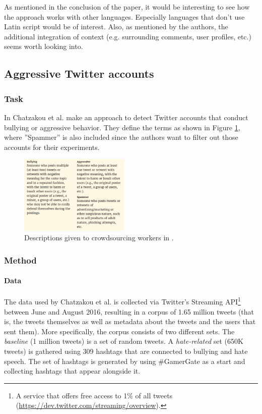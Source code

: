 \documentclass{proseminar}
\begin{document}
As mentioned in the conclusion of the paper, it would be interesting to see how the approach works with other languages. Especially languages that don't use Latin script would be of interest. Also, as mentioned by the authors, the additional integration of context (e.g. surrounding comments, user profiles, etc.) seems worth looking into.

\subsection{Aggressive Twitter accounts}
\subsubsection{Task}
In \cite{Twitter:2017} Chatzakou et al. make an approach to detect Twitter accounts that conduct bullying or aggressive behavior. They define the terms as shown in Figure \ref{fig:twitter_defs}, where ''Spammer'' is also included since the authors want to filter out those accounts for their experiments.

\begin{figure}
\centering
\includegraphics[width=0.47\textwidth]{img/twitter_defs}
\caption{Descriptions given to crowdsourcing workers in \cite{Twitter:2017}.}
\label{fig:twitter_defs}
\end{figure}

\subsubsection{Method}
\paragraph{Data} The data used by Chatzakou et al. is collected via Twitter's Streaming API\footnote{A service that offers free access to 1\% of all tweets (\url{https://dev.twitter.com/streaming/overview}).} between June and August 2016, resulting in a corpus of 1.65 million tweets (that is, the tweets themselves as well as metadata about the tweets and the users that sent them). More specifically, the corpus consists of two different sets. The \emph{baseline} (1 million tweets) is a set of random tweets. A \emph{hate-related} set (650K tweets) is gathered using 309 hashtags that are connected to bullying and hate speech. The set of hashtags is generated by using \#GamerGate as a start and collecting hashtags that appear alongside it.
\end{document}
